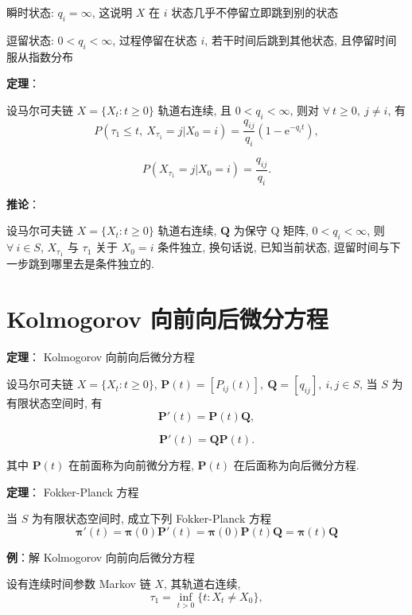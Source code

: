 \documentclass[openany]{ctexbook}
\theoremstyle{kaiti}
\theoremstyle{normal}
\begin{document}
瞬时状态: $q_i=\infty$, 这说明 $X$ 在 $i$ 状态几乎不停留立即跳到别的状态

逗留状态: $0 < q_i < \infty$, 过程停留在状态 $i$, 若干时间后跳到其他状态, 且停留时间服从指数分布

\textbf{定理}：

设马尔可夫链 $X=\{X_t:t\geqslant0\}$ 轨道右连续, 且 $0 < q_i < \infty$, 则对 $\forall~t\geqslant0,~j\neq i$, 有
\begin{equation}
  P(\tau_1\leqslant t,~X_{\tau_1}=j|X_0=i)=\frac{q_{ij}}{q_i}(1-\mathrm{e}^{-q_it}),
\end{equation}

\begin{equation}
  P(X_{\tau_1}=j|X_0=i)=\frac{q_{ij}}{q_i}.
\end{equation}

\textbf{推论}：

设马尔可夫链 $X=\{X_t:t\geqslant0\}$ 轨道右连续, $\bm{Q}$ 为保守 Q 矩阵, $0 < q_i < \infty$, 则 $\forall~i\in S$, $X_{\tau_1}$ 与 $\tau_1$ 关于 $X_0=i$ 条件独立, 换句话说, 已知当前状态, 逗留时间与下一步跳到哪里去是条件独立的.

\section{Kolmogorov 向前向后微分方程}

\textbf{定理}： Kolmogorov 向前向后微分方程

设马尔可夫链 $X=\{X_t:t\geqslant0\}$, $\bm{P}(t)=[P_{ij}(t)],~\bm{Q}=[q_{ij}],~i,j\in S$, 当 $S$ 为有限状态空间时, 有
\begin{equation}
  \bm{P}'(t)=\bm{P}(t)\bm{Q},
\end{equation}

\begin{equation}
  \bm{P}'(t)=\bm{Q}\bm{P}(t).
\end{equation}

其中 $\bm{P}(t)$ 在前面称为向前微分方程, $\bm{P}(t)$ 在后面称为向后微分方程.

\textbf{定理}： Fokker-Planck 方程

当 $S$ 为有限状态空间时, 成立下列 Fokker-Planck 方程
\begin{equation}
  \bm{\pi}'(t)=\bm{\pi}(0)\bm{P}'(t)=\bm{\pi}(0)\bm{P}(t)\bm{Q}=\bm{\pi}(t)\bm{Q}
\end{equation}

\textbf{例}：解 Kolmogorov 向前向后微分方程

设有连续时间参数 Markov 链 $X$, 其轨道右连续, 
\begin{equation}
  \tau_1=\inf_{t>0}\{t:X_t\neq X_0\},
\end{equation}
\end{document}
